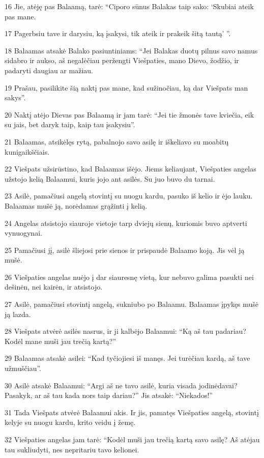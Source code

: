 \par 16 Jie, atėję pas Balaamą, tarė: “Ciporo sūnus Balakas taip sako: ‘Skubiai ateik pas mane. 
\par 17 Pagerbsiu tave ir darysiu, ką įsakysi, tik ateik ir prakeik šitą tautą’ ”. 
\par 18 Balaamas atsakė Balako pasiuntiniams: “Jei Balakas duotų pilnus savo namus sidabro ir aukso, aš negalėčiau peržengti Viešpaties, mano Dievo, žodžio, ir padaryti daugiau ar mažiau. 
\par 19 Prašau, pasilikite šią naktį pas mane, kad sužinočiau, ką dar Viešpats man sakys”. 
\par 20 Naktį atėjo Dievas pas Balaamą ir jam tarė: “Jei tie žmonės tave kviečia, eik su jais, bet daryk taip, kaip tau įsakysiu”. 
\par 21 Balaamas, atsikėlęs rytą, pabalnojo savo asilę ir iškeliavo su moabitų kunigaikščiais. 
\par 22 Viešpats užsirūstino, kad Balaamas išėjo. Jiems keliaujant, Viešpaties angelas užstojo kelią Balaamui, kuris jojo ant asilės. Su juo buvo du tarnai. 
\par 23 Asilė, pamačiusi angelą stovintį su nuogu kardu, pasuko iš kelio ir ėjo lauku. Balaamas mušė ją, norėdamas grąžinti į kelią. 
\par 24 Angelas atsistojo siauroje vietoje tarp dviejų sienų, kuriomis buvo aptverti vynuogynai. 
\par 25 Pamačiusi jį, asilė šliejosi prie sienos ir prispaudė Balaamo koją. Jis vėl ją mušė. 
\par 26 Viešpaties angelas nuėjo į dar siauresnę vietą, kur nebuvo galima pasukti nei dešinėn, nei kairėn, ir atsistojo. 
\par 27 Asilė, pamačiusi stovintį angelą, sukniubo po Balaamu. Balaamas įpykęs mušė ją lazda. 
\par 28 Viešpats atvėrė asilės nasrus, ir ji kalbėjo Balaamui: “Ką aš tau padariau? Kodėl mane muši jau trečią kartą?” 
\par 29 Balaamas atsakė asilei: “Kad tyčiojiesi iš manęs. Jei turėčiau kardą, aš tave užmuščiau”. 
\par 30 Asilė atsakė Balaamui: “Argi aš ne tavo asilė, kuria visada jodinėdavai? Pasakyk, ar aš tau kada nors taip dariau?” Jis atsakė: “Niekados!” 
\par 31 Tada Viešpats atvėrė Balaamui akis. Ir jis, pamatęs Viešpaties angelą, stovintį kelyje su nuogu kardu, krito veidu į žemę. 
\par 32 Viešpaties angelas jam tarė: “Kodėl muši jau trečią kartą savo asilę? Aš atėjau tau sukliudyti, nes nepritariu tavo kelionei. 

